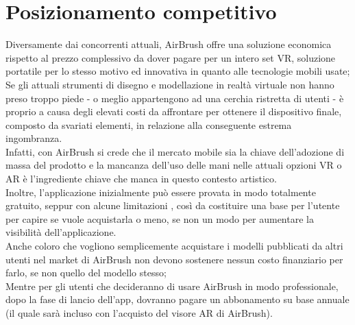 \documentclass[11pt,fleqn]{book} %
\begin{document}
				

\section{Posizionamento competitivo}
Diversamente dai concorrenti attuali, AirBrush offre una soluzione economica rispetto al prezzo complessivo da dover pagare per un intero set VR, soluzione portatile per lo stesso motivo ed innovativa in quanto alle tecnologie mobili usate; \\
Se gli attuali strumenti di disegno e modellazione in realtà virtuale  non hanno preso troppo piede - o meglio appartengono ad una cerchia ristretta di utenti - è proprio a causa degli elevati costi da affrontare per ottenere il dispositivo finale, composto da svariati elementi, in relazione alla conseguente estrema ingombranza.\\
Infatti, con AirBrush si crede che il mercato mobile sia la chiave dell'adozione di massa del prodotto e la mancanza dell'uso delle mani nelle attuali opzioni VR o AR è l'ingrediente chiave che manca in questo contesto artistico.\\
Inoltre, l'applicazione inizialmente può essere provata in modo totalmente gratuito, seppur con alcune limitazioni , così da costituire una base per l'utente per capire se vuole acquistarla o meno, se non un modo per aumentare la visibilità dell'applicazione.\\
Anche coloro che vogliono semplicemente acquistare i modelli pubblicati da altri utenti nel market di AirBrush  non devono sostenere nessun costo finanziario per farlo, se non quello del modello stesso;\\
Mentre per gli utenti che decideranno di usare AirBrush in modo professionale, dopo la fase di lancio dell'app, dovranno pagare un abbonamento su base annuale (il quale sarà incluso con l'acquisto del visore AR di AirBrush).




\end{document}
